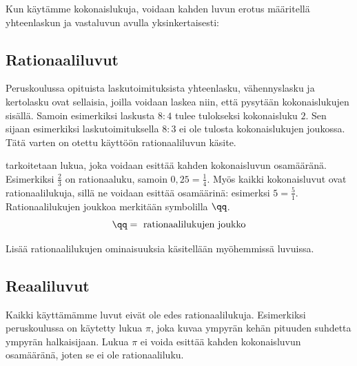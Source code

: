 %

Kun käytämme kokonaislukuja, voidaan kahden luvun erotus määritellä yhteenlaskun ja vastaluvun avulla yksinkertaisesti:


\subsection*{Rationaaliluvut}

Peruskoulussa opituista laskutoimituksista yhteenlasku, vähennyslasku ja kertolasku ovat sellaisia, joilla voidaan laskea niin, että pysytään kokonaislukujen sisällä. Samoin esimerkiksi laskusta $8:4$ tulee tulokseksi kokonaisluku $2$. Sen sijaan esimerkiksi laskutoimituksella $8:3$ ei ole tulosta kokonaislukujen joukossa. Tätä varten on otettu käyttöön rationaaliluvun käsite.

 tarkoitetaan lukua, joka voidaan esittää kahden kokonaisluvun osamääränä. Esimerkiksi $\frac{2}{3}$ on rationaaluku, samoin $0,25=\frac{1}{4}$. Myös kaikki kokonaisluvut ovat rationaalilukuja, sillä ne voidaan esittää osamäärinä: esimerksi $5=\frac{5}{1}$. Rationaalilukujen joukkoa merkitään symbolilla $\qq$. \[\qq= \text{ rationaalilukujen joukko} \]    

Lisää rationaalilukujen ominaisuuksia käsitellään myöhemmissä luvuissa.

\subsection*{Reaaliluvut}

Kaikki käyttämämme luvut eivät ole edes rationaalilukuja. Esimerkiksi peruskoulussa on käytetty lukua $\pi$, joka kuvaa ympyrän kehän pituuden suhdetta ympyrän halkaisijaan. Lukua $\pi$ ei voida esittää kahden kokonaisluvun osamääränä, joten se ei ole rationaaliluku.


